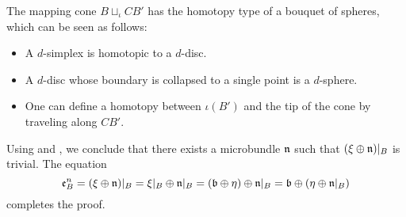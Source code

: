 \begin{myproof}
\begin{steps}
        The mapping cone $B \sqcup_\iota CB'$ has the homotopy type of a bouquet of spheres,
        which can be seen as follows:
        \begin{itemize}
            \item A $d$-simplex is homotopic to a $d$-disc.
            \item A $d$-disc whose boundary is collapsed to a single point is a $d$-sphere.
            \item One can define a homotopy between $\iota(B')$ and the tip of the cone by
            traveling along $CB'$.
        \end{itemize}
        
        Using  and ,
        we conclude that there exists a microbundle $\mathfrak{n}$ such that $(\xi \oplus{} \mathfrak{n})\vert_{B}$ is trivial.
        The equation
        \[
            \be{B}
            = (\whitney{\xi}{\bn})\restr{B}
            = \whitney{\xi\restr{B}}{\bn\restr{B}}
            = \whitney{(\whitney{\bb}{\eta})}{\bn\restr{B}}
            = \whitney{\bb}{(\whitney{\eta}{\bn\restr{B}})}
        \]
        completes the proof.
    \end{steps}
\end{myproof}